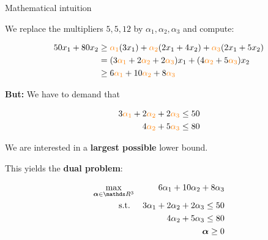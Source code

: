 \documentclass[11pt,compress,t,notes=noshow, xcolor=table]{beamer}
\begin{document}
\begin{vbframe}{Mathematical intuition}
\medskip

We replace the multipliers $5, 5, 12$ by $\alpha_1, \alpha_2, \alpha_3$ and compute:

%

\vspace*{-0.5cm}

\begin{align*}
    50x_1 + 80x_2 &\ge \textcolor{orange}{\alpha_1} (3x_1) + \textcolor{orange}{\alpha_2} (2x_1 + 4x_2) + \textcolor{orange}{\alpha_3} (2x_1 + 5x_2) \\
    &= (3 \textcolor{orange}{\alpha_1} + 2  \textcolor{orange}{\alpha_2} + 2 \textcolor{orange}{\alpha_3}) x_1 + (4  \textcolor{orange}{\alpha_2} + 5 \textcolor{orange}{\alpha_3}) x_2 \\
    &\geq 6 \textcolor{orange}{\alpha_1} + 10 \textcolor{orange}{\alpha_2} + 8 \textcolor{orange}{\alpha_3}
\end{align*}

\textbf{But:} We have to demand that

\vspace*{-0.5cm}
\begin{align*}
    3 \textcolor{orange}{\alpha_1} + 2  \textcolor{orange}{\alpha_2} + 2 \textcolor{orange}{\alpha_3} &\le 50 \\
    4  \textcolor{orange}{\alpha_2} + 5 \textcolor{orange}{\alpha_3} &\le 80
\end{align*}

\framebreak

We are interested in a \textbf{largest possible} lower bound.

\medskip

This yields the \textbf{dual problem}:

\begin{eqnarray*}
    \max_{\bm{\alpha} \in \R^3} && 6 \alpha_1 + 10 \alpha_2 + 8 \alpha_3 \\
    \text{s.t. } && 3\alpha_1 + 2\alpha_2 + 2\alpha_3 \le 50 \\
    && 4\alpha_2 + 5\alpha_3 \le 80\\
    && \bm{\alpha} \ge 0
\end{eqnarray*}


\end{vbframe}
\end{document}
